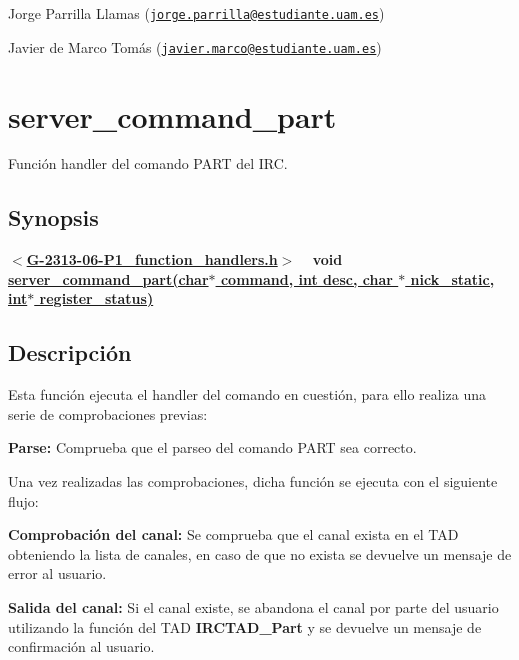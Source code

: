 \begin{DoxyItemize}
\item Jorge Parrilla Llamas (\href{mailto:jorge.parrilla@estudiante.uam.es}{\tt jorge.\+parrilla@estudiante.\+uam.\+es}) 
\item Javier de Marco Tomás (\href{mailto:javier.marco@estudiante.uam.es}{\tt javier.\+marco@estudiante.\+uam.\+es}) 
\end{DoxyItemize}\hypertarget{server_command_part}{}\section{server\+\_\+command\+\_\+part}\label{server_command_part}
Función handler del comando P\+A\+R\+T del I\+R\+C.\hypertarget{server_command_part_synopsis_part}{}\subsection{Synopsis}\label{server_command_part_synopsis_part}
{ {\bfseries $<$\hyperlink{G-2313-06-P1__function__handlers_8h}{G-\/2313-\/06-\/\+P1\+\_\+function\+\_\+handlers.\+h}$>$} ~\newline
 {\bfseries void \hyperlink{G-2313-06-P1__function__handlers_8c_aba1a3da1fb58bb35076e7ea56037463e}{server\+\_\+command\+\_\+part(char$\ast$ command, int desc, char $\ast$ nick\+\_\+static, int$\ast$ register\+\_\+status)}} } \hypertarget{server_command_part_descripcion_part}{}\subsection{Descripción}\label{server_command_part_descripcion_part}
Esta función ejecuta el handler del comando en cuestión, para ello realiza una serie de comprobaciones previas\+:


\begin{DoxyItemize}
\item {\bfseries Parse\+:} Comprueba que el parseo del comando P\+A\+R\+T sea correcto. 
\end{DoxyItemize}

Una vez realizadas las comprobaciones, dicha función se ejecuta con el siguiente flujo\+:


\begin{DoxyItemize}
\item {\bfseries Comprobación del canal\+:} Se comprueba que el canal exista en el T\+A\+D obteniendo la lista de canales, en caso de que no exista se devuelve un mensaje de error al usuario.  
\item {\bfseries Salida del canal\+:} Si el canal existe, se abandona el canal por parte del usuario utilizando la función del T\+A\+D {\bfseries I\+R\+C\+T\+A\+D\+\_\+\+Part} y se devuelve un mensaje de confirmación al usuario.  
\end{DoxyItemize}

